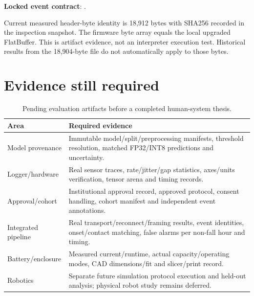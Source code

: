 \textbf{Locked event contract}: .


Current measured header-byte identity is 18,912 bytes with SHA256 recorded in the inspection snapshot. The firmware byte array equals the local upgraded FlatBuffer. This is artifact evidence, not an interpreter execution test. Historical results from the 18,904-byte file do not automatically apply to those bytes.

\section{Evidence still required}
\begin{table}[htbp]
\centering\caption{Pending evaluation artifacts before a completed human-system thesis.}
\begin{tabular}{@{}p{4cm}p{9.7cm}@{}}\toprule
Area & Required evidence\\\midrule
Model provenance & Immutable model/split/preprocessing manifests, threshold resolution, matched FP32/INT8 predictions and uncertainty.\\
Logger/hardware & Real sensor traces, rate/jitter/gap statistics, axes/units verification, tensor arena and timing records.\\
Approval/cohort & Institutional approval record, approved protocol, consent handling, cohort manifest and independent event annotations.\\
Integrated pipeline & Real transport/reconnect/framing results, event identities, onset/contact matching, false alarms per non-fall hour and timing.\\
Battery/enclosure & Measured current/runtime, actual capacity/operating modes, CAD dimensions/fit and slicer/print record.\\
Robotics & Separate future simulation protocol execution and held-out analysis; physical robot study remains deferred.\\\bottomrule
\end{tabular}
\end{table}
